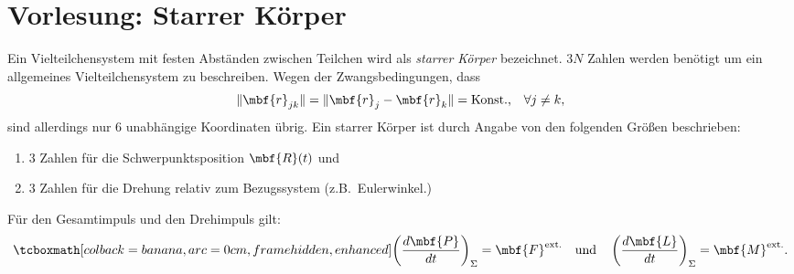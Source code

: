
\section{Vorlesung: Starrer Körper}
Ein Vielteilchensystem mit festen Abständen zwischen Teilchen wird als \emph{starrer Körper} bezeichnet.
\figbox
$3N$ Zahlen werden benötigt um ein allgemeines Vielteilchensystem zu beschreiben. Wegen der Zwangsbedingungen, dass
\begin{equation}
  \|\mbf{r}_{jk}\| = \|\mbf{r}_{j}-\mbf{r}_{k}\| = \text{Konst.,} \quad \forall j\not= k,
\end{equation}
sind allerdings nur $6$ unabhängige Koordinaten übrig. Ein starrer Körper ist durch Angabe von den folgenden Größen beschrieben:
\begin{enumerate}
  \item $3$ Zahlen für die Schwerpunktsposition $\mbf{R}(t)$ und
  \item $3$ Zahlen für die Drehung relativ zum Bezugssystem (z.B.\ Eulerwinkel.)
\end{enumerate}
Für den Gesamtimpuls und den Drehimpuls gilt:
\begin{equation}
  \eqbox{\left(\frac{d\mbf{P}}{dt}\right)_{\Sigma} =\mbf{F}^{\text{ext.}}\quad\text{und}\quad \left(\frac{d\mbf{L}}{dt}\right)_{\Sigma} =\mbf{M}^{\text{ext.}}.}
\end{equation}

